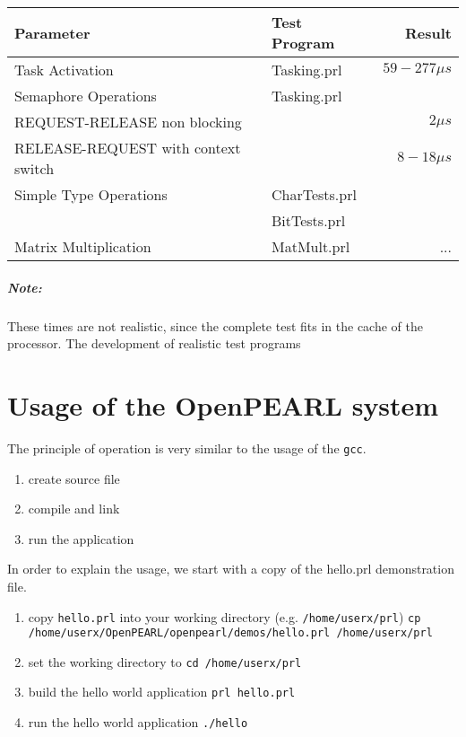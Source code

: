 \documentclass[oneside,10pt]{scrbook}
\begin{document}
\begin{tabular}{|p{5cm}|l|r|}
\hline
Parameter & Test Program & Result \\
\hline
Task Activation & Tasking.prl & $59-277 \mu s$\\
\hline
Semaphore Operations & Tasking.prl &  \\
REQUEST-RELEASE non blocking & & $2 \mu s$\\
RELEASE-REQUEST with context switch & & $8-18\mu s$\\

\hline
Simple Type Operations & CharTests.prl & \\
                       & BitTests.prl & \\
\hline
Matrix Multiplication & MatMult.prl & ...\\
\hline
\end{tabular}

\paragraph{Note:} These times are not realistic, since the complete test fits in the cache of 
the processor. The development of realistic test programs 
\fi

\chapter{Usage of the OpenPEARL system}

The principle of operation is very similar to the usage of the \texttt{gcc}.

\begin{enumerate}
\item create source file
\item compile and link
\item run the application
\end{enumerate}

In order to explain the usage, we start with a copy of the hello.prl demonstration file.

\begin{enumerate}
\item copy \texttt{hello.prl} into your working directory (e.g. \texttt{/home/userx/prl}) \newline
   \texttt{cp /home/userx/OpenPEARL/openpearl/demos/hello.prl /home/userx/prl}
\item set the working directory to \newline
   \texttt{cd /home/userx/prl}
\item build the hello world application \newline
   \texttt{prl hello.prl}
\item run the hello world application \newline
   \texttt{./hello}
\end{enumerate}
\end{document}
